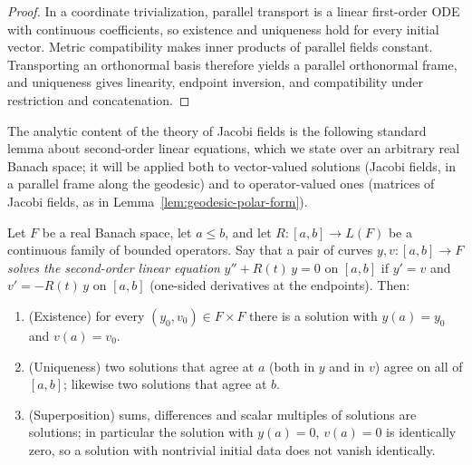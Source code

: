 \begin{proof}
\sketch
{}
\leanok
In a coordinate trivialization, parallel transport is a linear first-order ODE with continuous coefficients, so existence and uniqueness hold for every initial vector. Metric compatibility makes inner products of parallel fields constant. Transporting an orthonormal basis therefore yields a parallel orthonormal frame, and uniqueness gives linearity, endpoint inversion, and compatibility under restriction and concatenation.
\end{proof}

The analytic content of the theory of Jacobi fields is the following
standard lemma about second-order linear equations, which we state
over an arbitrary real Banach space; it will be applied both to
vector-valued solutions (Jacobi fields, in a parallel frame along the
geodesic) and to operator-valued ones (matrices of Jacobi fields, as
in Lemma~\ref{lem:geodesic-polar-form}).

\begin{lemma}
\label{lem:second-order-linear-ode}
\leanok


Let $F$ be a real Banach space, let $a\le b$, and let
$R\colon[a,b]\to L(F)$ be a continuous family of bounded operators.
Say that a pair of curves $y,v\colon[a,b]\to F$ {\em solves the
second-order linear equation} $y''+R(t)\,y=0$ on $[a,b]$ if $y'=v$
and $v'=-R(t)\,y$ on $[a,b]$ (one-sided derivatives at the
endpoints). Then:
\begin{enumerate}
\item (Existence) for every $(y_0,v_0)\in F\times F$ there is a
solution with $y(a)=y_0$ and $v(a)=v_0$.
\item (Uniqueness) two solutions that agree at $a$ (both in $y$ and
in $v$) agree on all of $[a,b]$; likewise two solutions that agree
at $b$.
\item (Superposition) sums, differences and scalar multiples of
solutions are solutions; in particular the solution with $y(a)=0$,
$v(a)=0$ is identically zero, so a solution with nontrivial initial
data does not vanish identically.
\end{enumerate}
\end{lemma}

